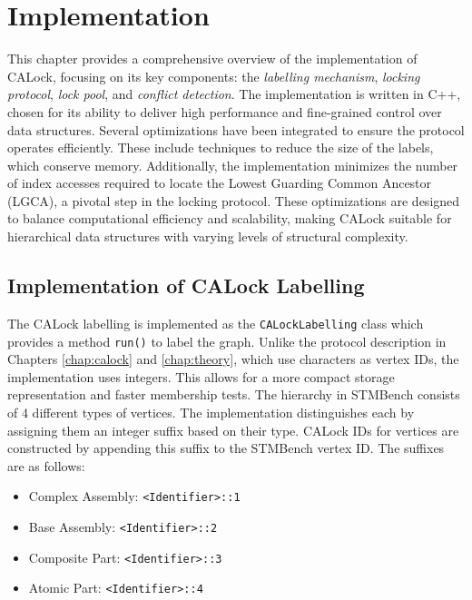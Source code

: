 \chapter{Implementation}
\label{chap:implementation}

\minitoc

This chapter provides a comprehensive overview of the implementation of CALock, focusing on its key components: the \emph{labelling mechanism}, \emph{locking protocol}, \emph{lock pool}, and \emph{conflict detection}. The implementation is written in C++, chosen for its ability to deliver high performance and fine-grained control over data structures. 
Several optimizations have been integrated to ensure the protocol operates efficiently. These include techniques to reduce the size of the labels, which conserve memory. Additionally, the implementation minimizes the number of index accesses required to locate the Lowest Guarding Common Ancestor (LGCA), a pivotal step in the locking protocol. These optimizations are designed to balance computational efficiency and scalability, making CALock suitable for hierarchical data structures with varying levels of structural complexity.


\section{Implementation of CALock Labelling}
\label{sec:calock-labelling}
The CALock labelling is implemented as the \texttt{CALockLabelling} class which provides a method \texttt{run()} to label the graph. Unlike the protocol description in Chapters \ref{chap:calock} and \ref{chap:theory}, which use characters as vertex IDs, the implementation uses integers. This allows for a more compact storage representation and faster membership tests. The hierarchy in STMBench consists of 4 different types of vertices. The implementation distinguishes each by assigning them an integer suffix based on their type. CALock IDs for vertices are constructed by appending this suffix to the STMBench vertex ID. The suffixes are as follows:

\begin{itemize}
    \item Complex Assembly: \texttt{<Identifier>::1}
    \item Base Assembly: \texttt{<Identifier>::2}
    \item Composite Part: \texttt{<Identifier>::3}
    \item Atomic Part: \texttt{<Identifier>::4}
\end{itemize}

